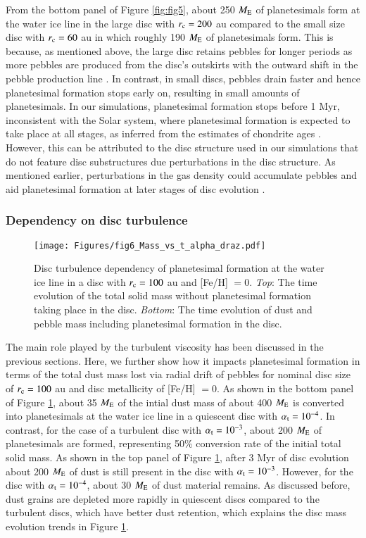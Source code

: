 \documentclass{aa}
\begin{document}
From the bottom panel of Figure \ref{fig:fig5}, about 250 $M_{\rm{E}}$ of planetesimals form at the water ice line in the large disc with $r_{\rm c} = 200$ au compared to the small size disc with $r_{\rm c} = 60$ au in which roughly 190 $M_{\rm{E}}$ of planetesimals form. This is because, as mentioned above, the large disc retains pebbles for longer periods as more pebbles are produced from the disc's outskirts with the outward shift in the pebble production line \citep{LambrechtsJohansen2014}. In contrast, in small discs, pebbles drain faster and hence planetesimal formation stops early on, resulting in small amounts of planetesimals. In our simulations, planetesimal formation stops before 1 Myr, inconsistent with the Solar system, where planetesimal formation is expected to take place at all stages, as inferred from the estimates of chondrite ages \citep{Amelin2002,Kleine2009,Connelly2012,Kruijer2014,Kruijer2017,Onyett2023}. However, this can be attributed to the disc structure used in our simulations that do not feature disc substructures due perturbations in the disc structure. As mentioned earlier, perturbations in the gas density could accumulate pebbles and aid planetesimal formation at later stages of disc evolution \citep[e.g.,][]{Izidoro2021}.

\subsubsection{Dependency on disc turbulence}
\begin{figure}
   \texttt{[image: Figures/fig6\_Mass\_vs\_t\_alpha\_draz.pdf]}
   \caption{Disc turbulence dependency of planetesimal formation at the water ice line in a disc with $r_{\rm c}=100$ au and [Fe/H] $= 0$. {\textit{Top}}: The time evolution of the total solid mass without planetesimal formation taking place in the disc. {\textit{Bottom}}: The time evolution of dust and pebble mass including planetesimal formation in the disc. }
   \label{fig:fig6}
\end{figure}
The main role played by the turbulent viscosity has been discussed in the previous sections. Here, we further show how it impacts planetesimal formation in terms of the total dust mass lost via radial drift of pebbles for nominal disc size of $r_{\rm c}=100$ au and disc metallicity of [Fe/H] $= 0$. As shown in the bottom panel of Figure \ref{fig:fig6}, about 35 $M_{\rm{E}}$ of the intial dust mass of about 400 $M_{\rm{E}}$ is converted into planetesimals at the water ice line in a quiescent disc with $\alpha_{\rm t}=10^{-4}$. In contrast, for the case of a turbulent disc with $\alpha_{\rm t}=10^{-3}$, about 200 $M_{\rm{E}}$ of planetesimals are formed, representing 50\% conversion rate of the initial total solid mass. As shown in the top panel of Figure \ref{fig:fig6}, after 3 Myr of disc evolution about 200 $M_{\rm{E}}$ of dust is still present in the disc with $\alpha_{\rm t}=10^{-3}$. However, for the disc with $\alpha_{\rm t}=10^{-4}$, about 30 $M_{\rm{E}}$ of dust material remains. As discussed before, dust grains are depleted more rapidly in quiescent discs compared to the turbulent discs, which have better dust retention, which explains the disc mass evolution trends in Figure \ref{fig:fig6}.
\end{document}
